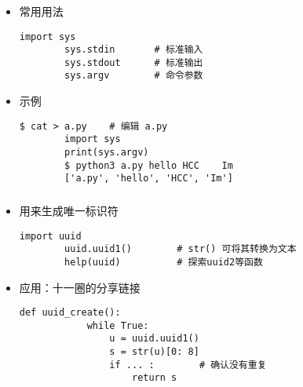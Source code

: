 \begin{CJK}{UTF8}{gbsn}
\begin{frame} [fragile]
	\frametitle{}
	\begin{itemize}
	\item 常用用法
		\begin{lstlisting}[style=pythonstyle, gobble=8, texcl]
		import sys
		sys.stdin		# 标准输入
		sys.stdout		# 标准输出
		sys.argv		# 命令参数
		\end{lstlisting}
	\item {}示例
		\begin{lstlisting}[style=pythonstyle, gobble=8, texcl, escapechar=@]
		$ cat > a.py	# 编辑 a.py
		import sys
		print(sys.argv)
		$ python3 a.py hello HCC    Im
		['a.py', 'hello', 'HCC', 'Im']
		\end{lstlisting}
	\end{itemize}
\end{frame}

\begin{frame} [fragile]
	\frametitle{}
	\linespread{1.25}
	\begin{itemize}
	\item {}用来生成唯一标识符
		\begin{lstlisting}[style=pythonstyle, gobble=8, texcl, escapechar=@]
		import uuid
		uuid.uuid1()		# str() 可将其转换为文本
		help(uuid)			# 探索uuid2等函数
		\end{lstlisting}
	\item 应用：十一圈的分享链接
		\begin{lstlisting}[style=pythonstyle, gobble=8, texcl, escapechar=@]
		def uuid_create():
			while True:
				u = uuid.uuid1()
				s = str(u)[0: 8]
				if ... :		# 确认没有重复
					return s
		\end{lstlisting}
	\end{itemize}
\end{frame}


\end{CJK}
